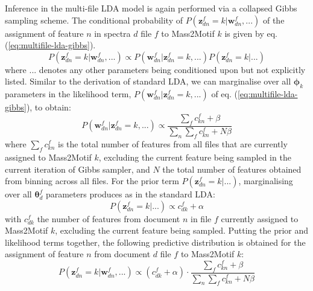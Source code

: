 Inference in the multi-file LDA model is again performed via a collapsed Gibbs sampling scheme. The conditional probability of $P(\boldsymbol{z}_{dn}^f=k \vert \boldsymbol{w}_{dn}^f, ...)$ of the assignment of feature $n$ in spectra $d$ file $f$ to Mass2Motif $k$ is given by eq. (\ref{eq:multifile-lda-gibbs}).
\begin{equation}
P(\boldsymbol{z}_{dn}^f=k \vert \boldsymbol{w}_{dn}^f, ...) \propto P(\boldsymbol{w}_{dn}^f \vert \boldsymbol{z}_{dn}^f=k, ...) P(\boldsymbol{z}_{dn}^f=k \vert ...)
\label{eq:multifile-lda-gibbs}
\end{equation}
where $...$ denotes any other parameters being conditioned upon but not explicitly listed. Similar to the derivation of standard LDA, we can marginalise over all $\boldsymbol{\phi}_k$ parameters in the likelihood term, $P(\boldsymbol{w}_{dn}^f \vert \boldsymbol{z}_{dn}^f=k, ...)$ of eq. (\ref{eq:multifile-lda-gibbs}), to obtain:
\begin{equation}
P(\boldsymbol{w}_{dn}^f \vert \boldsymbol{z}_{dn}^f=k, ...) \propto \frac{\sum_{f} c_{kn}^f + \beta}{\sum_{n}\sum_{f} c_{kn}^f + N\beta}
\label{eq:multifile-lda-gibbs-likelihood}
\end{equation}
where $\sum_{f} c_{kn}^f$ is the total number of features from all files that are currently assigned to Mass2Motif $k$, excluding the current feature being sampled in the current iteration of Gibbs sampler, and $N$ the total number of features obtained from binning across all files. For the prior term $P(\boldsymbol{z}_{dn}^f=k \vert ...)$, marginalising over all $\boldsymbol{\theta}_{d}^f$ parameters produces as in the standard LDA:
\begin{equation}
P(\boldsymbol{z}_{dn}^f=k \vert ...) \propto  c_{dk}^f + \alpha
\label{eq:multifile-lda-gibbs-prior}
\end{equation}
with $c_{dk}^f$ the number of features from document $n$ in file $f$ currently assigned to Mass2Motif $k$, excluding the current feature being sampled. 
Putting the prior and likelihood terms together, the following predictive distribution is obtained for the assignment of feature $n$ from document $d$ file $f$ to Mass2Motif $k$:
\begin{equation}
P(\boldsymbol{z}_{dn}^f=k \vert \boldsymbol{w}_{dn}^f, ...) \propto (c_{dk}^f + \alpha) \cdot \frac{\sum_{f} c_{kn}^f + \beta}{\sum_{n}\sum_{f} c_{kn}^f + N\beta}
\label{eq:multifile-lda-gibbs-combined}
\end{equation}

